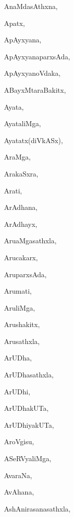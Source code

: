 \begin{multicols}{3}
{\noindent
{AnaMdasAthxna}, \pageref{AnaMdasAthxna}

\noindent
{Apatx}, \pageref{Apatx}

\noindent
{ApAyxyana}, \pageref{ApAyxyana}

\noindent
{ApAyxyanaparxsAda}, \pageref{ApAyxyanaparxsAda}

\noindent
{ApAyxyanoVdaka}, \pageref{ApAyxyanoVdaka}

\noindent
{ABayxMtaraBakitx}, \pageref{ABayxMtaraBakitx}

\noindent
{Ayata}, \pageref{Ayata}

\noindent
{AyataliMga}, \pageref{AyataliMga}

\noindent
{Ayatatx(diVkASx)}, \pageref{Ayatatx(diVkASx)}

\noindent
{AraMga}, \pageref{AraMga}

\noindent
{ArakaSxra}, \pageref{Ara(273)kaSxra}

\noindent
{Arati}, \pageref{Arati}

\noindent
{ArAdhana}, \pageref{ArAdhana}

\noindent
{ArAdhayx}, \pageref{ArAdhayx}

\noindent
{{Aru}aMgasathxla}, \pageref{Aru(273304)aMgasathxla}

\noindent
{Arucakarx}, \pageref{Arucakarx}

\noindent
{AruparxsAda}, \pageref{AruparxsAda}

\noindent
{Arumati}, \pageref{Arumati}

\noindent
{AruliMga}, \pageref{AruliMga}

\noindent
{Arushakitx}, \pageref{Aru(273304)shakitx}

\noindent
{Arusathxla}, \pageref{Arusathxla}

\noindent
{ArUDha}, \pageref{ArUDha}

\noindent
{ArUDhasathxla}, \pageref{ArUDhasathxla}

\noindent
{ArUDhi}, \pageref{ArUDhi}

\noindent
{ArUDhakUTa}, \pageref{ArUDhakUTa}

\noindent
{ArUDhiyakUTa}, \pageref{ArUDhiyakUTa}

\noindent
{AroVgisu}, \pageref{AroVgisu}

\noindent
{ASeRVyaliMga}, \pageref{ASeRVyaliMga}

\noindent
{AvaraNa}, \pageref{AvaraNa}

\noindent
{AvAhana}, \pageref{AvAhana}

\noindent
{AshAnirasanasathxla}, \pageref{AshAnirasanasathxla}

}
\end{multicols}
